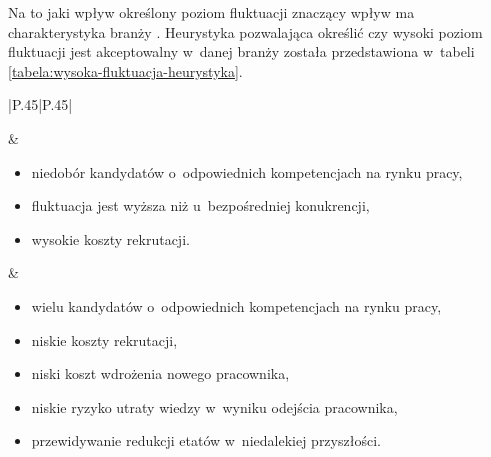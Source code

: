 Na to jaki wpływ określony poziom fluktuacji znaczący wpływ ma charakterystyka branży \cite{taylor-2006}.
Heurystyka pozwalająca określić czy wysoki poziom fluktuacji jest akceptowalny w~danej branży została przedstawiona w~tabeli \ref{tabela:wysoka-fluktuacja-heurystyka}.

\noindent\begin{minipage}{\textwidth}
             \begin{table}[H]
                 \raggedright\caption{Heurystyka do oceny wysokiego poziomu fluktuacji\label{tabela:wysoka-fluktuacja-heurystyka}}
                 \begin{center}
                     \begin{tabular}{|P{.45\textwidth}|P{.45\textwidth}|}

                         \hline
                          &
                          \\
                         \hline

                         \begin{itemize}
                             \item niedobór kandydatów o~odpowiednich kompetencjach na rynku pracy,
                             \item fluktuacja jest wyższa niż u~bezpośredniej konukrencji,
                             \item wysokie koszty rekrutacji.
                         \end{itemize} &
                         \begin{itemize}
                             \item wielu kandydatów o~odpowiednich kompetencjach na rynku pracy,
                             \item niskie koszty rekrutacji,
                             \item niski koszt wdrożenia nowego pracownika,
                             \item niskie ryzyko utraty wiedzy w~wyniku odejścia pracownika,
                             \item przewidywanie redukcji etatów w~niedalekiej przyszłości.
                         \end{itemize} \\
                         \hline
                     \end{tabular}
                 \end{center}
                 \raggedright{}
                 \vspace{0.75cm}
             \end{table}
\end{minipage}

